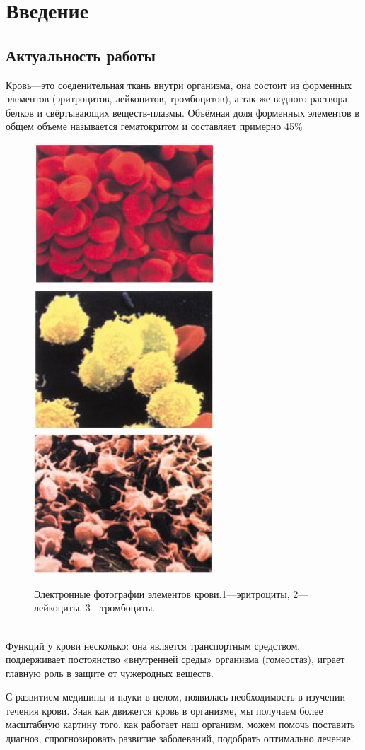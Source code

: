 \section{Введение}
\subsection{Актуальность работы}
Кровь—это соеденительная ткань внутри организма, она состоит из форменных элементов (эритроцитов, лейкоцитов, тромбоцитов), а так же водного раствора белков и свёртывающих веществ-плазмы. Объёмная доля форменных элементов в общем объеме называется гематокритом и составляет примерно 45\%
\begin{figure}[h]
\centering
\includegraphics[width=0.3\linewidth]{erotr.jpg}
\includegraphics[width=0.3\linewidth]{leiko.jpg}
\includegraphics[width=0.3\linewidth]{trombo.jpg}
\caption{ Электронные фотографии элементов крови.1—эритроциты, 2—лейкоциты, 3—тромбоциты. \cite{rls:2003}}
\label{fig:mpr}
\end{figure}\\
Функций у крови несколько: она является транспортным средством, поддерживает постоянство «внутренней среды» организма (гомеостаз), играет главную роль в защите от чужеродных веществ.

С развитием медицины и науки в целом, появилась необходимость в изучении течения крови. Зная как движется кровь в организме, мы получаем более масштабную картину того, как работает наш организм, можем помочь поставить диагноз, спрогнозировать развитие заболеваний, подобрать оптимально лечение.

